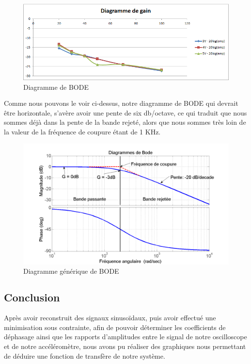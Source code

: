 \documentclass[french,a4paper,12pt]{report}
\begin{document}
	\begin{figure}[!ht]
    \center
  	\includegraphics[width=15cm]{baud.png}
    \caption{Diagramme de BODE}
	\end{figure}	
	
	Comme nous pouvons le voir ci-dessus, notre diagramme de BODE qui devrait être horizontale, s'avère avoir une pente de six db/octave, ce qui traduit que nous sommes déjà dans la pente de la bande rejeté, alors que nous sommes très loin de la valeur de la fréquence de coupure étant de 1 KHz.
	
	\begin{figure}[!ht]
    \center
  	\includegraphics[width=15cm]{bode.png}
    \caption{Diagramme générique de BODE}
	\end{figure}
	
\newpage	
	
		\subsection{Conclusion}
			Après avoir reconstruit des signaux sinusoïdaux, puis avoir effectué une minimisation sous contrainte, afin de pouvoir déterminer les coefficients de déphasage ainsi que les rapports d'amplitudes entre le signal de notre oscilloscope et de notre accéléromètre, nous avons pu réaliser des graphiques nous permettant de déduire une fonction de transfère de notre système.
			
\end{document}
